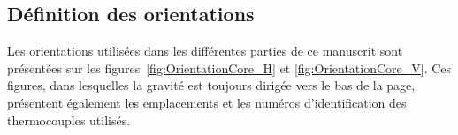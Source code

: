 \subsection{Définition des orientations}
Les orientations utilisées dans les différentes parties de ce manuscrit sont présentées sur les figures~\ref{fig:OrientationCore_H} et \ref{fig:OrientationCore_V}. Ces figures, dans lesquelles la gravité est toujours dirigée vers le bas de la page, présentent également les emplacements et les numéros d'identification des thermocouples utilisés.\medskip

\begin{figure}[!htp]
    \centering
	\begin{subfigure}[c]{.4\textwidth}
		\centering
		
		\caption{}
		\label{fig:OrientationCore_H1}
	\end{subfigure}
	\begin{subfigure}[c]{.4\textwidth}
		\centering
		\caption{}
		\label{fig:OrientationCore_H1_Schema}
	\end{subfigure} \vspace{1cm}
	

\end{figure}
